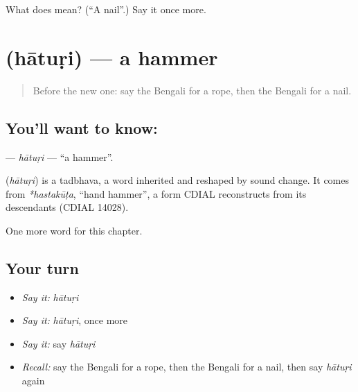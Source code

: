 \begin{tcolorbox}[breakable,colback=teal!4,colframe=teal!35!black,title={Before you move on}]
What does  mean? (\textquotedblleft{}A nail\textquotedblright{}.) Say it once more.
\end{tcolorbox}
\section[\texorpdfstring{\bn{হাতুড়ি} (hātuṛi)}{হাতুড়ি (hātuṛi)}]{ (hātuṛi) — a hammer}

\label{lesson:BN-C111-haturi}



\begin{quote}
Before the new one: say the Bengali for a rope, then the Bengali for a nail.
\end{quote}

\subsection*{You'll want to know: }
\textbf{} — \emph{hātuṛi} — \textquotedblleft{}a hammer\textquotedblright{}.

\begin{cousinweb}
\textbf{} (\emph{hātuṛi}) is a tadbhava, a word inherited and reshaped by sound change. It comes from \emph{*hastakūṭa}, \textquotedblleft{}hand hammer\textquotedblright{}, a form CDIAL reconstructs from its descendants (CDIAL 14028).
\end{cousinweb}

\begin{grammarlens}[title={What you've built}]
One more word for this chapter.
\end{grammarlens}

\subsection*{Your turn}
\begin{itemize}
\raggedright
  \item \emph{Say it:} \emph{hātuṛi}
  \item \emph{Say it:} \emph{hātuṛi}, once more
  \item \emph{Say it:} say \emph{hātuṛi}
  \item \emph{Recall:} say the Bengali for a rope, then the Bengali for a nail, then say \emph{hātuṛi} again
\end{itemize}

